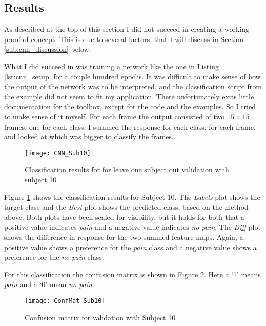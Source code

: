 \documentclass[Main]{subfiles}
\begin{document}
	\subsection{Results} %
		\label{sub:cnn_results}
		As described at the top of this section I did not succeed in creating a working proof-of-concept.
		This is due to several factors, that I will discuss in Section \ref{sub:cnn_discussion} below.

		What I did succeed in was training a network like the one in Listing \ref{lst:cnn_setup} for a couple hundred epochs.
		It was difficult to make sense of how the output of the network was to be interpreted, and the classification script from the example did not seem to fit my application.
		There unfortunately exits little documentation for the toolbox, except for the code and the examples.
		So I tried to make sense of it myself.
		For each frame the output consisted of two $15\times15$ frames, one for each class.
		I summed the response for each class, for each frame, and looked at which was bigger to classify the frames.

		\begin{figure}[H]
			\begin{center}
				\texttt{[image: CNN\_Sub10]}
			\end{center}
			\caption{Classification results for for leave one subject out validation with subject 10}
			\label{fig:Results_sub10}
		\end{figure}

		Figure \ref{fig:Results_sub10} shows the classification results for Subject 10.
		The \emph{Labels} plot shows the target class and the \emph{Best} plot shows the predicted class, based on the method above.
		Both plots have been scaled for visibility, but it holds for both that a positive value indicates \emph{pain} and a negative value indicates \emph{no pain}.
		The \emph{Diff} plot shows the difference in response for the two summed feature maps.
		Again, a positive value shows a preference for the \emph{pain} class and a negative value shows a preference for the \emph{no pain} class.

		For this classification the confusion matrix is shown in Figure \ref{fig:cnn_conf10}. Here a `1' means \emph{pain} and a `0' mean \emph{no pain}

		\begin{figure}[H]
			\begin{center}
				\texttt{[image: ConfMat\_Sub10]}
			\end{center}
			\caption{Confusion matrix for validation with Subject 10}
			\label{fig:cnn_conf10}
		\end{figure}
\end{document}
